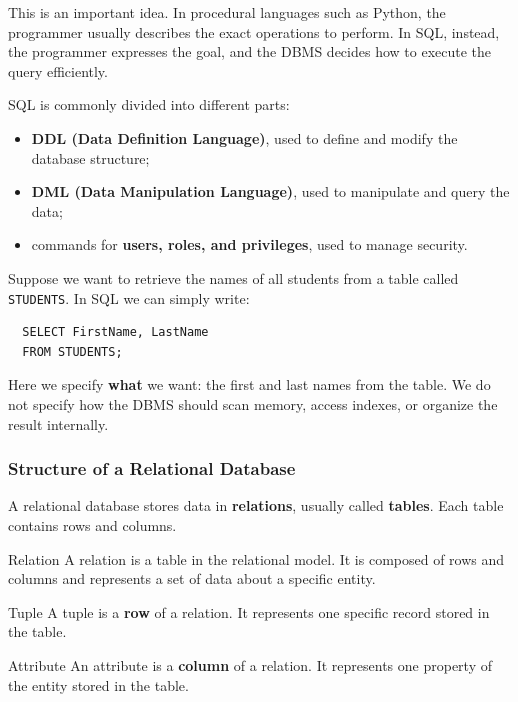  This is an important idea. In procedural languages such as Python, the programmer usually describes the exact operations to perform. In SQL, instead, the programmer expresses the goal, and the DBMS decides how to execute the query efficiently.

 SQL is commonly divided into different parts:
 \begin{itemize}
  \item \textbf{DDL (Data Definition Language)}, used to define and modify the database structure;
  \item \textbf{DML (Data Manipulation Language)}, used to manipulate and query the data;
  \item commands for \textbf{users, roles, and privileges}, used to manage security.
 \end{itemize}

 \vs
 \begin{example}
  Suppose we want to retrieve the names of all students from a table called \texttt{STUDENTS}. In SQL we can simply write:
  \begin{verbatim}
  SELECT FirstName, LastName
  FROM STUDENTS;
  \end{verbatim}
  \vspace{-0.25cm}
  Here we specify \textbf{what} we want: the first and last names from the table. We do not specify how the DBMS should scan memory, access indexes, or organize the result internally.
 \end{example}

 \subsubsection{Structure of a Relational Database}

 A relational database stores data in \textbf{relations}, usually called \textbf{tables}. Each table contains rows and columns.

 \begin{defbox}{Relation}
  A relation is a table in the relational model. It is composed of rows and columns and represents a set of data about a specific entity.
 \end{defbox}

 \begin{defbox}{Tuple}
  A tuple is a \textbf{row} of a relation. It represents one specific record stored in the table.
 \end{defbox}

 \begin{defbox}{Attribute}
  An attribute is a \textbf{column} of a relation. It represents one property of the entity stored in the table.
 \end{defbox}

